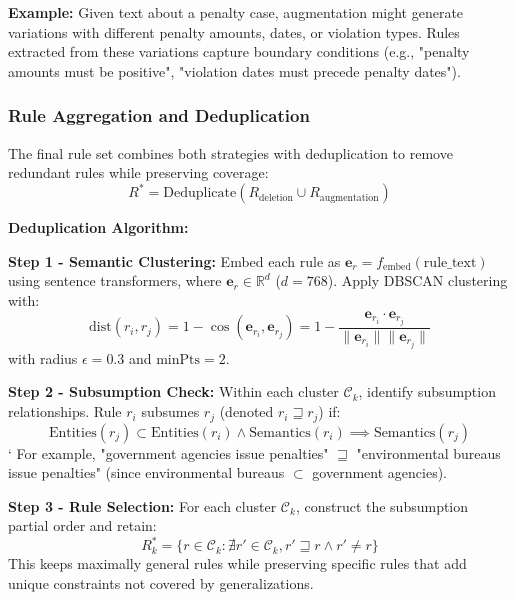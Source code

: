 \documentclass[runningheads]{llncs}
\begin{document}
\textbf{Example:} Given text about a penalty case, augmentation might generate variations with different penalty amounts, dates, or violation types. Rules extracted from these variations capture boundary conditions (e.g., "penalty amounts must be positive", "violation dates must precede penalty dates").

\subsubsection{Rule Aggregation and Deduplication}

The final rule set combines both strategies with deduplication to remove redundant rules while preserving coverage:
\begin{equation}
R^* = \text{Deduplicate}(R_{\text{deletion}} \cup R_{\text{augmentation}})
\end{equation}

\textbf{Deduplication Algorithm:}

\textbf{Step 1 - Semantic Clustering:} Embed each rule as $\mathbf{e}_r = f_{\text{embed}}(\text{rule\_text})$ using sentence transformers, where $\mathbf{e}_r \in \mathbb{R}^d$ ($d=768$). Apply DBSCAN clustering with:
\begin{equation}
\text{dist}(r_i, r_j) = 1 - \cos(\mathbf{e}_{r_i}, \mathbf{e}_{r_j}) = 1 - \frac{\mathbf{e}_{r_i} \cdot \mathbf{e}_{r_j}}{\|\mathbf{e}_{r_i}\| \|\mathbf{e}_{r_j}\|}
\end{equation}
with radius $\epsilon = 0.3$ and $\text{minPts} = 2$.

\textbf{Step 2 - Subsumption Check:} Within each cluster $\mathcal{C}_k$, identify subsumption relationships. Rule $r_i$ subsumes $r_j$ (denoted $r_i \sqsupseteq r_j$) if:
\begin{equation}
\text{Entities}(r_j) \subset \text{Entities}(r_i) \land \text{Semantics}(r_i) \implies \text{Semantics}(r_j)
\end{equation}`
For example, "government agencies issue penalties" $\sqsupseteq$ "environmental bureaus issue penalties" (since environmental bureaus $\subset$ government agencies).

\textbf{Step 3 - Rule Selection:} For each cluster $\mathcal{C}_k$, construct the subsumption partial order and retain:
\begin{equation}
R_k^* = \{r \in \mathcal{C}_k : \nexists r' \in \mathcal{C}_k, r' \sqsupseteq r \land r' \neq r\}
\end{equation}
This keeps maximally general rules while preserving specific rules that add unique constraints not covered by generalizations.
\end{document}
